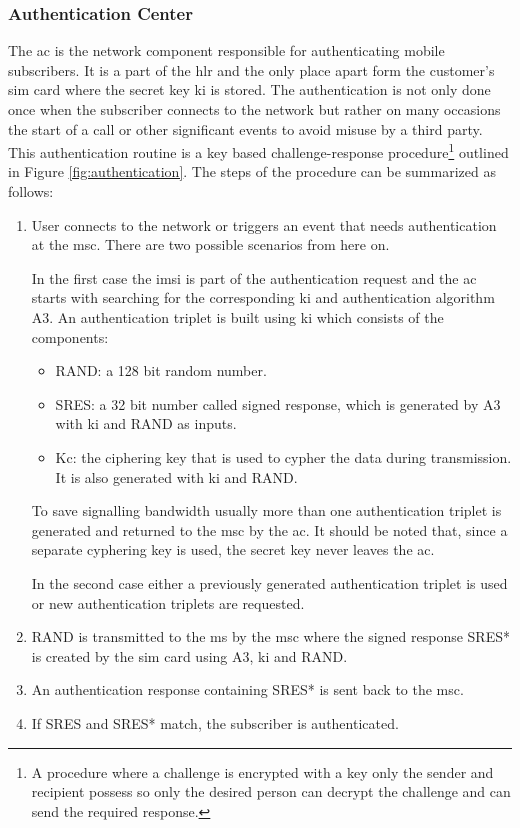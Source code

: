 \subsubsection{Authentication Center}
\label{sec:authentication}
The \gls{ac} is the network component responsible for authenticating mobile subscribers.
It is a part of the \gls{hlr} and the only place apart form the customer's \gls{sim} card where the secret key \gls{ki} is stored.
The authentication is not only done once when the subscriber connects to the network but rather on many occasions \eg the start of a call or other significant events to avoid misuse by a third party.
This authentication routine is a key based challenge-response procedure\footnote{A procedure where a challenge is encrypted with a key only the sender and recipient possess so only the desired person can decrypt the challenge and can send the required response.} outlined in Figure \ref{fig:authentication}.
The steps of the procedure can be summarized as follows:
\begin{enumerate}
	\item User connects to the network or triggers an event that needs authentication at the \gls{msc}.
	There are two possible scenarios from here on.
 	
 	In the first case the \gls{imsi} is part of the authentication request and the \gls{ac} starts with searching for the corresponding \gls{ki} and authentication algorithm A3.
	An authentication triplet is built using \gls{ki} which consists of the components:
	\begin{itemize}
		\item RAND: a 128 bit random number.
		\item SRES: a 32 bit number called signed response, which is generated by A3 with \gls{ki} and RAND as inputs.
		\item Kc: the ciphering key that is used to cypher the data during transmission.
		It is also generated with \gls{ki} and RAND.
	\end{itemize}
	To save signalling bandwidth usually more than one authentication triplet is generated and returned to the \gls{msc} by the \gls{ac}.
	It should be noted that, since a separate cyphering key is used, the secret key never leaves the \gls{ac}.
	
	In the second case either a previously generated authentication triplet is used or new authentication triplets are requested.
	\item RAND is transmitted to the \gls{ms} by the \gls{msc} where the signed response SRES* is created by the \gls{sim} card using A3, \gls{ki} and RAND.
	
	\item An authentication response containing SRES* is sent back to the \gls{msc}.
	
	\item If SRES and SRES* match, the subscriber is authenticated.
\end{enumerate}

